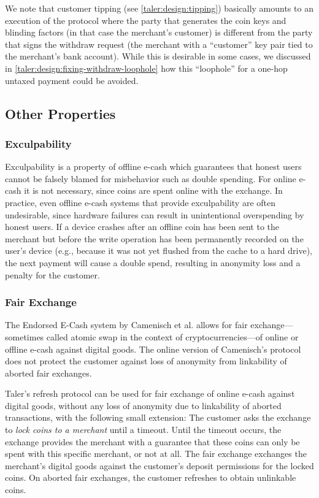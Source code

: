 We note that customer tipping (see \ref{taler:design:tipping}) basically amounts to an execution
of the  protocol where the party that generates the coin keys
and blinding factors (in that case the merchant's customer) is different from
the party that signs the withdraw request (the merchant with a ``customer'' key
pair tied to the merchant's bank account).  While this is desirable in some
cases, we discussed in \ref{taler:design:fixing-withdraw-loophole} how this ``loophole'' for a one-hop untaxed
payment could be avoided.

\subsection{Other Properties}

\subsubsection{Exculpability}
Exculpability is a property of offline e-cash which guarantees that honest users
cannot be falsely blamed for misbehavior such as double spending.  For online
e-cash it is not necessary, since coins are spent online with the exchange.  In
practice, even offline e-cash systems that provide exculpability are often
undesirable, since hardware failures can result in unintentional overspending
by honest users.  If a device crashes after an offline coin has been sent to
the merchant but before the write operation has been permanently recorded on
the user's device (e.g.,  because it was not yet flushed from the cache to a
hard drive), the next payment will cause a double spend, resulting in anonymity
loss and a penalty for the customer.

\subsubsection{Fair Exchange}\label{sec:security:atomic-swaps}


The Endorsed E-Cash system by Camenisch et al. \cite{camenisch2007endorsed}
allows for fair exchange---sometimes called atomic swap in the context of
cryptocurrencies---of online or offline e-cash against digital goods.  The
online version of Camenisch's protocol does not protect the customer against
loss of anonymity from linkability of aborted fair exchanges.

Taler's refresh protocol can be used for fair exchange of online e-cash against
digital goods, without any loss of anonymity due to linkability of aborted
transactions, with the following small extension: The customer asks the
exchange to \emph{lock coins to a merchant} until a timeout.  Until the timeout
occurs, the exchange provides the merchant with a guarantee that these coins can
only be spent with this specific merchant, or not at all.  The
fair exchange exchanges the merchant's digital goods against the customer's
deposit permissions for the locked coins.  On aborted fair exchanges,
the customer refreshes to obtain unlinkable coins.

